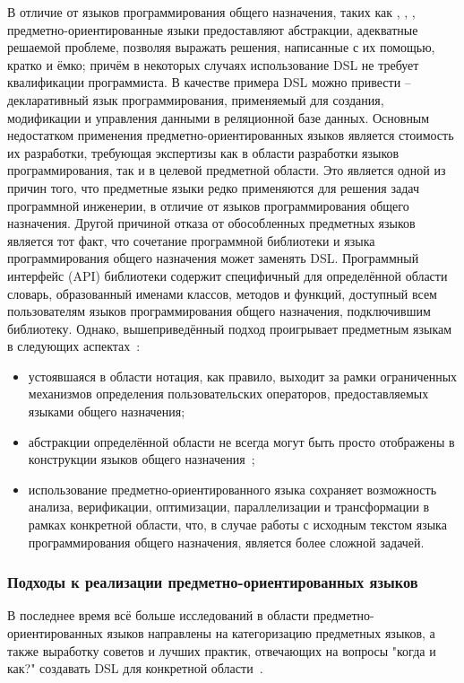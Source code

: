 В отличие от языков программирования общего назначения, таких как ,
, , предметно-ориентированные языки предоставляют
абстракции, адекватные решаемой проблеме, позволяя выражать решения,
написанные с их помощью, кратко и ёмко; причём в некоторых случаях
использование DSL не требует квалификации программиста.
В качестве примера DSL можно привести  --  декларативный язык
программирования, применяемый для создания, модификации и управления данными в
реляционной базе данных.
Основным недостатком применения предметно-ориентированных языков является
стоимость их разработки, требующая экспертизы как в области разработки языков
программирования, так и в целевой предметной области.
Это является одной из причин того, что предметные языки редко применяются
для решения задач программной инженерии, в отличие от языков программирования
общего назначения.
Другой причиной отказа от обособленных предметных языков является тот факт,
что сочетание программной библиотеки и языка программирования общего
назначения может заменять DSL.
Программный интерфейс (API) библиотеки содержит специфичный для определённой
области словарь, образованный именами классов, методов и функций, доступный
всем пользователям языков программирования общего назначения, подключившим
библиотеку.
Однако, вышеприведённый подход проигрывает предметным языкам в следующих
аспектах~\cite{when-and-how-develop-dsl,dsl-spectrum-wile}:
\begin{itemize}
	\item устоявшаяся в области нотация, как правило, выходит за рамки
	ограниченных механизмов определения пользовательских операторов,
	предоставляемых языками общего назначения;
	\item абстракции определённой области не всегда могут быть
	просто отображены в конструкции языков общего назначения~\cite{dsl-traversal-transform};
	\item использование предметно-ориентированного языка сохраняет
	возможность анализа, верификации, оптимизации, параллелизации и
	трансформации в рамках конкретной области, что, в случае работы с
	исходным текстом языка программирования общего назначения, является
	более сложной задачей.
\end{itemize}

\subsubsection{Подходы к реализации предметно-ориентированных языков}
В последнее время всё больше исследований в области
предметно-ориен\-тированных языков направлены на категоризацию предметных
языков, а также выработку советов и лучших практик, отвечающих на вопросы
"когда и как?" создавать DSL для конкретной области~\cite{when-and-how-develop-dsl,study-on-preliminary-approaches-develop-dsl,spinellis-dsl-patterns}.
